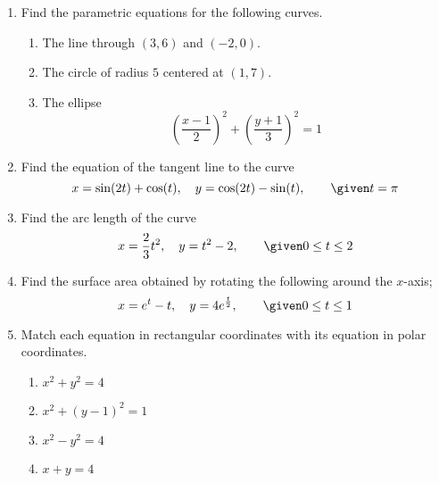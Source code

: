 \begin{enumerate}
\newpage %

  \item Find the parametric equations for the following curves.
    \begin{enumerate}[itemsep=16em]
      \item The line through \((3,6)\) and \((-2, 0)\).

      \item The circle of radius \(5\) centered at \((1,7)\).

      \item The ellipse
        \[%
          \left( \frac{x-1}{2} \right)^2 + \left(\frac{y+1}{3}\right)^2 = 1
        \]%
    \end{enumerate}

\newpage %

  \item Find the equation of the tangent line to the curve
    \[%
    x = \sin (2t) + \cos (t), \quad y = \cos (2t) - \sin (t), \qquad \given t
    = \pi
    \]%

\newpage %

\item Find the arc length of the curve
  \[%
  x = \frac{2}{3}t^2, \quad y = t^2 - 2, \qquad \given 0 \leq t \leq 2
  \]%


\newpage %

  \item Find the surface area obtained by rotating the following around the
    \(x\)-axis;
    \[%
    x = e^t - t, \quad y = 4e^{\frac{t}{2}}, \qquad \given 0 \leq t \leq 1
    \]%


\newpage %

  \item Match each equation in rectangular coordinates with its equation in
    polar coordinates.

  \begin{multicols}{2}
    \begin{enumerate}
      \item \(x^2 + y^2 = 4\)
      \item \(x^2 + (y-1)^2 = 1\)
      \item \(x^2 - y^2 = 4\)
      \item \(x + y = 4\)
    \end{enumerate}


\end{multicols}
\end{enumerate}
